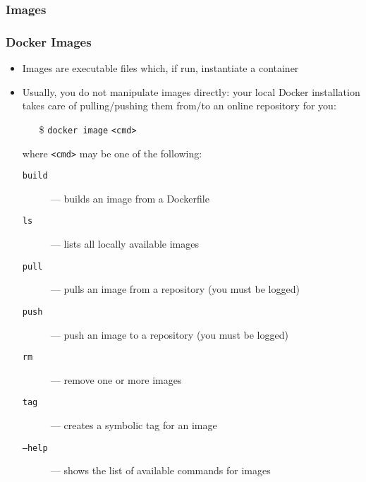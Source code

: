 \documentclass[presentation]{beamer}\mode<presentation>{\usetheme{AMSBolognaFC}}
\begin{document}
\subsubsection{Images}

\begin{frame}
\frametitle[Docker Images]{Docker Images}

\begin{itemize}
	\item Images are executable files which, if run, instantiate a container
	\item Usually, you do not manipulate images directly: your local Docker installation takes care of pulling/pushing them from/to an online \alert{repository} for you:
	\begin{itemize}
		\item[\$] \texttt{docker image} \texttt{\alert{<cmd>}}
	\end{itemize}
	where \texttt{<cmd>} may be one of the following:
	\begin{description}
		\item[\texttt{build}] --- builds an image from a \alert{Dockerfile}
		\item[\texttt{ls}] --- lists all locally available images
		\item[\texttt{pull}] --- pulls an image from a \alert{repository} (you must be logged)
		\item[\texttt{push}] --- push an image to a \alert{repository} (you must be logged)
		\item[\texttt{rm}] --- remove one or more images
		\item[\texttt{tag}] --- creates a symbolic tag for an image
		\item[\texttt{--help}] --- shows the list of available commands for images

	\end{description}

\end{itemize}

\end{frame}
\end{document}
